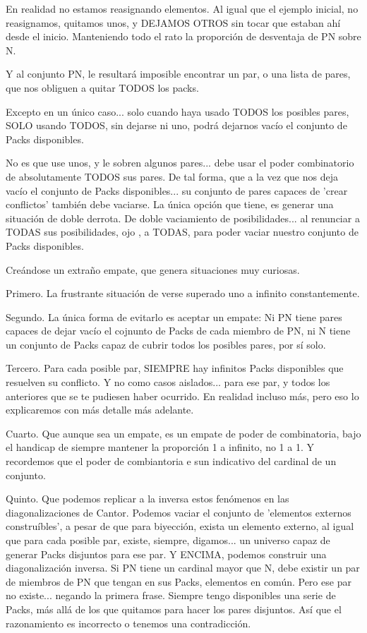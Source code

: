 En realidad no estamos reasignando elementos. Al igual que el ejemplo inicial, no reasignamos, quitamos unos, y DEJAMOS OTROS sin tocar que estaban ahí desde el inicio. Manteniendo todo el rato la proporción de desventaja de PN sobre N.

Y al conjunto PN, le resultará imposible encontrar un par, o una lista de pares, que nos obliguen a quitar TODOS los packs.

Excepto en un único caso... solo cuando haya usado TODOS los posibles pares, SOLO usando TODOS, sin dejarse ni uno, podrá dejarnos vacío el conjunto de Packs disponibles.

No es que use unos, y le sobren algunos pares... debe usar el poder combinatorio de absolutamente TODOS sus pares. De tal forma, que a la vez que nos deja vacío el conjunto de Packs disponibles... su conjunto de pares capaces de 'crear conflictos' también debe vaciarse. La única opción que tiene, es generar una situación de doble derrota. De doble vaciamiento de posibilidades... al renunciar a TODAS sus posibilidades, ojo , a TODAS, para poder vaciar nuestro conjunto de Packs disponibles.

Creándose un extraño empate, que genera situaciones muy curiosas.

Primero. La frustrante situación de verse superado uno a infinito constantemente.

Segundo. La única forma de evitarlo es aceptar un empate: Ni PN tiene pares capaces de dejar vacío el cojnunto de Packs de cada miembro de PN, ni N tiene un conjunto de Packs capaz de cubrir todos los posibles pares, por sí solo.

Tercero. Para cada posible par, SIEMPRE hay infinitos Packs disponibles que resuelven su conflicto. Y no como casos aislados... para ese par, y todos los anteriores que se te pudiesen haber ocurrido. En realidad incluso más, pero eso lo explicaremos con más detalle más adelante.

Cuarto. Que aunque sea un empate, es un empate de poder de combinatoria, bajo el handicap de siempre mantener la proporción 1 a infinito, no 1 a 1. Y recordemos que el poder de combiantoria e sun indicativo del cardinal de un conjunto.

Quinto. Que podemos replicar a la inversa estos fenómenos en las diagonalizaciones de Cantor. Podemos vaciar el conjunto de 'elementos externos construíbles', a pesar de que para biyección, exista un elemento externo, al igual que para cada posible par, existe, siempre, digamos... un universo capaz de generar Packs disjuntos para ese par. Y ENCIMA, podemos construir una diagonalización inversa. Si PN tiene un cardinal mayor que N, debe existir un par de miembros de PN que tengan en sus Packs, elementos en común. Pero ese par no existe... negando la primera frase. Siempre tengo disponibles una serie de Packs, más allá de los que quitamos para hacer los pares disjuntos. Así que el razonamiento es incorrecto o tenemos una contradicción.




